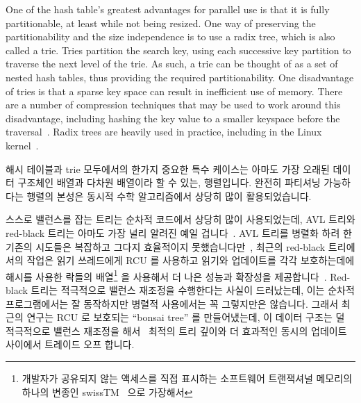 One of the hash table's greatest advantages for parallel use is that it
is fully partitionable, at least while not being resized.
One way of preserving the partitionability and the size independence is
to use a radix tree, which is also called a trie.
Tries partition the search key, using each successive key partition
to traverse the next level of the trie.
As such, a trie can be thought of as a set of nested hash tables,
thus providing the required partitionability.
One disadvantage of tries is that a sparse key space can result in
inefficient use of memory.
There are a number of compression techniques that may be used to
work around this disadvantage, including hashing the key value to
a smaller keyspace before the
traversal~\cite{RobertOlsson2006a}.
Radix trees are heavily used in practice, including in the Linux
kernel~\cite{NickPiggin2006radixtree}.
\fi

해시 테이블과 trie 모두에서의 한가지 중요한 특수 케이스는 아마도 가장 오래된
데이터 구조체인 배열과 다차원 배열이라 할 수 있는, 행렬입니다.
완전히 파티셔닝 가능하다는 행렬의 본성은 동시적 수학 알고리즘에서 상당히 많이
활용되었습니다.

스스로 밸런스를 잡는 트리는 순차적 코드에서 상당히 많이 사용되었는데, AVL
트리와 red-black 트리는 아마도 가장 널리 알려진 예일
겁니다~\cite{ThomasHCorman2001Algorithms}.
AVL 트리를 병렬화 하려 한 기존의 시도들은 복잡하고 그다지 효율적이지
못했습니다만~\cite{Ellis80}, 최근의 red-black 트리에서의 작업은 읽기 쓰레드에게
RCU 를 사용하고 읽기와 업데이트를 각각 보호하는데에 해시를 사용한 락들의
배열\footnote{
	개발자가 공유되지 않는 액세스를 직접 표시하는 소프트웨어 트랜잭셔널
	메모리의 하나의 변종인 swissTM~\cite{AleksandarDragovejic2011STMnotToy}
	으로 가장해서}
을 사용해서 더 나은 성능과 확장성을
제공합니다~\cite{PhilHoward2011RCUTMRBTree,PhilipWHoward2013RCUrbtree}.
Red-black 트리는 적극적으로 밸런스 재조정을 수행한다는 사실이 드러났는데, 이는
순차적 프로그램에서는 잘 동작하지만 병렬적 사용에서는 꼭 그렇지만은 않습니다.
그래서 최근의 연구는 RCU 로 보호되는 ``bonsai tree'' 를 만들어냈는데, 이 데이터
구조는 덜 적극적으로 밸런스 재조정을
해서~\cite{AustinClements2012RCULinux:mmapsem} 최적의 트리 깊이와 더 효과적인
동시의 업데이트 사이에서 트레이드 오프 합니다.
\iffalse

